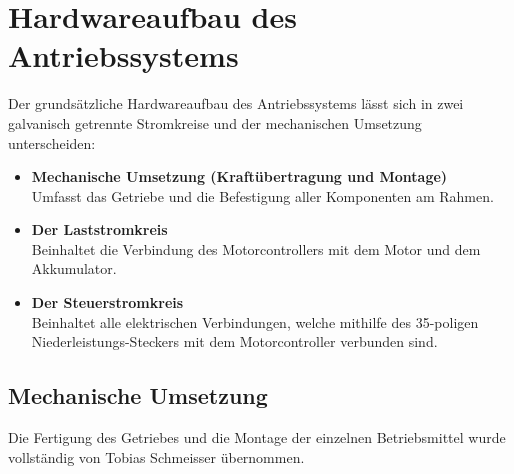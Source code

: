 \newpage



\section{Hardwareaufbau des Antriebssystems}
Der grundsätzliche Hardwareaufbau des Antriebssystems lässt sich in zwei galvanisch getrennte Stromkreise und der mechanischen Umsetzung unterscheiden:
\\[5mm]
\begin{itemize}
	\item \textbf{Mechanische Umsetzung (Kraftübertragung und Montage)} 
	\\ \medskip Umfasst das Getriebe und die Befestigung aller Komponenten am Rahmen.
	\medskip
	\item \textbf{Der Laststromkreis}
	\\ \medskip Beinhaltet die Verbindung des Motorcontrollers mit dem Motor und dem Akkumulator.
	\medskip
	\item \textbf{Der Steuerstromkreis}
	\\ \medskip Beinhaltet alle elektrischen Verbindungen, welche mithilfe des 35-poligen
	\\ Niederleistungs-Steckers mit dem Motorcontroller verbunden sind.
\end{itemize}

\newpage



\subsection{Mechanische Umsetzung}
Die Fertigung des Getriebes und die Montage der einzelnen Betriebsmittel wurde vollständig von Tobias Schmeisser übernommen.


\newpage



